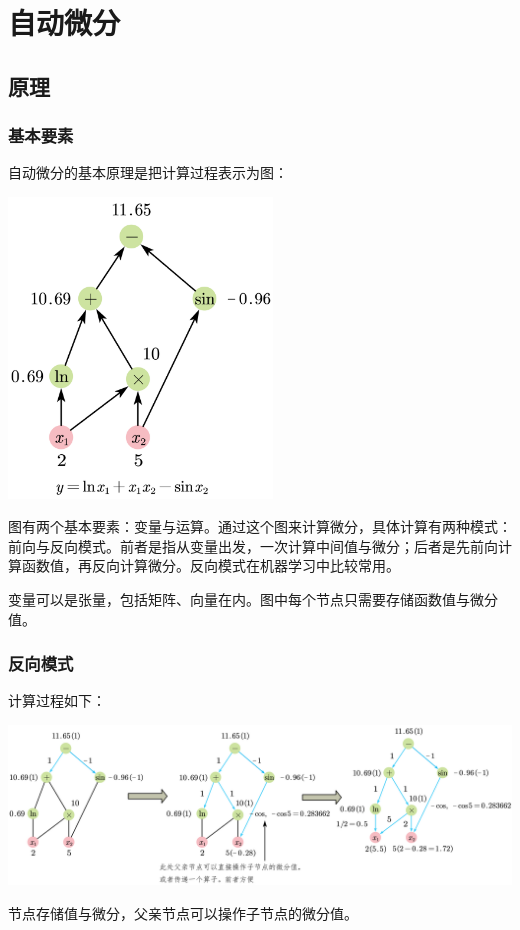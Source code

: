 \section{自动微分}
\subsection{原理}
\subsubsection{基本要素}
自动微分的基本原理是把计算过程表示为图：
\begin{center}
\includegraphics[width=7cm]{figure/ComputingGraph.png}
\end{center}
图有两个基本要素：变量与运算。通过这个图来计算微分，具体计算有两种模式：前向与反向模式。前者是指从变量出发，一次计算中间值与微分；后者是先前向计算函数值，再反向计算微分。反向模式在机器学习中比较常用。

变量可以是张量，包括矩阵、向量在内。图中每个节点只需要存储函数值与微分值。
\subsubsection{反向模式}
计算过程如下：
\begin{center}
\includegraphics[width=\linewidth]{figure/ReverseMode.png}
\end{center}
节点存储值与微分，父亲节点可以操作子节点的微分值。
